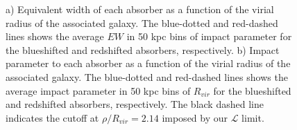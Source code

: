 \documentclass[twocolumn,tighten]{aastex6}
\begin{document}
\begin{figure}[ht]
\centering
{}
\caption{\small{a) Equivalent width of each absorber as a function of the virial radius of the associated galaxy. The blue-dotted and red-dashed lines shows the average $EW$ in 50 kpc bins of impact parameter for the blueshifted and redshifted absorbers, respectively. b) Impact parameter to each absorber as a function of the virial radius of the associated galaxy. The blue-dotted and red-dashed lines shows the average impact parameter in 50 kpc bins of $R_{vir}$ for the blueshifted and redshifted absorbers, respectively. The black dashed line indicates the cutoff at $\rho/R_{vir} =2.14$ imposed by our $\mathcal{L}$ limit.}}
\vspace{5pt}
\end{figure}


\vspace{10pt}
\end{document}
